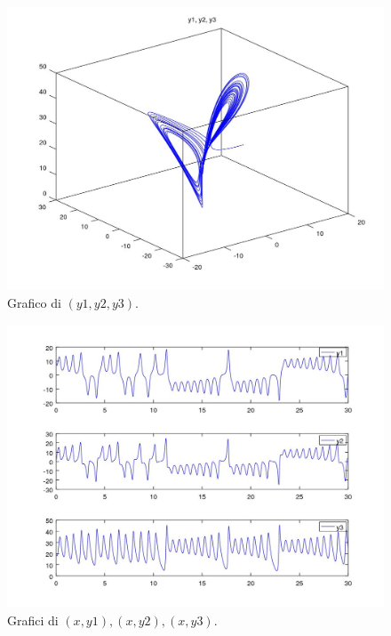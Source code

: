 \documentclass[11pt,a4paper,twoside,openright,titlepage,
headinclude,footinclude,BCOR5mm,
numbers=noenddot,cleardoublepage=empty,
tablecaptionabove]{scrbook}
\begin{document}
\begin{center}
\begin{figure}[h!]
\includegraphics[width=\textwidth]{figs/esercizio2_2.jpg}
\caption{Grafico di $(y1, y2, y3)$.}
\end{figure}
\end{center}

\begin{center}
\begin{figure}[h!]
\includegraphics[width=\textwidth]{figs/esercizio2_3.jpg}
\caption{Grafici di $(x, y1), (x, y2), (x, y3)$.}
\end{figure}
\end{center}
\end{document}
